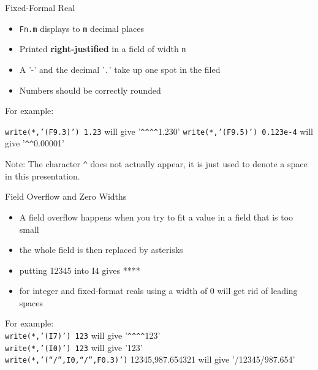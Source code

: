 \documentclass{beamer}
\begin{document}
\begin{frame}{Fixed-Formal Real}

  \begin{itemize}
    \item \texttt{Fn.m} displays to \texttt{m} decimal places
    \vfill\item Printed \textbf{right-justified} in a field of width \texttt{n}
    \vfill\item A '-' and the decimal '\texttt{.}' take up one spot in the filed
    \vfill\item Numbers should be correctly rounded
  \end{itemize}
  \vfill
  For example:
  \begin{center}
    \texttt{write(*,'(F9.3)') 1.23} will give '\texttt{\^}\texttt{\^}\texttt{\^}\texttt{\^}1.230'
    \texttt{write(*,'(F9.5)') 0.123e-4} will give '\texttt{\^}\texttt{\^}0.00001'
  \end{center}
  \vfill
  \alert{Note:} The character \texttt{\^} does not actually appear, it is just used to denote a space in this presentation.

\end{frame}
\begin{frame}{Field Overflow and Zero Widths}

  \begin{itemize}
    \item A field overflow happens when you try to fit a value in a field that is too small
    \vfill\item the whole field is then replaced by asterisks
    \vfill\item putting 12345 into I4 gives ****
    \vfill\item for integer and fixed-format reals using a width of 0 will get rid of leading spaces
  \end{itemize}
  \vfill
  For example: \\
    \texttt{write(*,'(I7)') 123} will give  '\texttt{\^}\texttt{\^}\texttt{\^}\texttt{\^}123' \\
    \texttt{write(*,'(I0)') 123} will give  '123' \\
    \texttt{write(*,'(``/'',I0,``/'',F0.3)')} 12345,987.654321 will give '/12345/987.654'

\end{frame}
\end{document}
